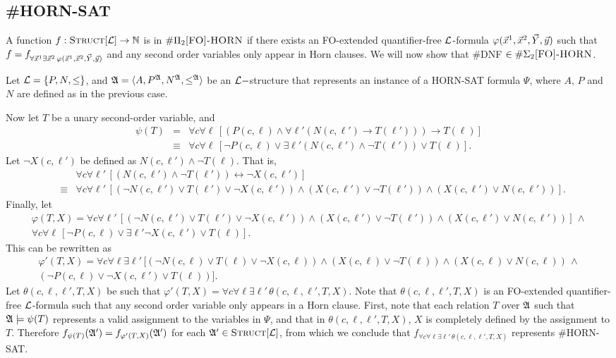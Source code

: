 \subsection{{\sc \#HORN-SAT}}
A function $f:\textsc{Struct}[{\cal L}] \to \mathbb{N}$ is in $\#\Pi_2\textsc{[FO]-HORN}$ if there exists an {\sc FO}-extended quantifier-free ${\cal L}$-formula $\varphi(\vec{x}^1,\vec{x}^2,\vec{Y},\vec{y})$ such that $f = f_{\forall\vec{x}^1\exists \vec{x}^2\,\varphi(\vec{x}^1,\vec{x}^2,\vec{Y},\vec{y})}$ and any second order variables only appear in Horn clauses. We will now show that {\sc \#DNF} $\in\#\Sigma_2\textsc{[FO]-HORN}$.

Let ${\cal L} = \{P,N,\leq\}$, and ${\frak A} = \langle A, P^{\frak A}, N^{\frak A}, \leq^{\frak A} \rangle$ be an ${\cal L}-$structure that represents an instance of a {\sc HORN-SAT} formula $\Psi$, where $A$, $P$ and $N$ are defined as in the previous case.

Now let $T$ be a unary second-order variable, and
\begin{eqnarray*}
	\psi(T) &=& \forall c \forall \ell\, [(P(c,\ell)\wedge\forall\ell'(N(c,\ell')\to T(\ell')))\to T(\ell)] \\
	&\equiv& \forall c \forall \ell\, [\neg P(c,\ell)\vee \exists\ell'(N(c,\ell')\wedge \neg T(\ell'))\vee T(\ell)].
\end{eqnarray*}
Let $\neg X(c,\ell')$ be defined as $N(c,\ell')\wedge \neg T(\ell)$. That is,
\begin{eqnarray*}
	&& \forall c \forall \ell'\, [(N(c,\ell') \wedge \neg T(\ell')) \leftrightarrow \neg X(c,\ell')]\\
	&\equiv& \forall c \forall \ell'\,[(\neg N(c,\ell')\vee T(\ell')\vee \neg X(c,\ell'))\wedge (X(c,\ell')\vee \neg T(\ell'))\wedge (X(c,\ell')\vee N(c,\ell'))].
\end{eqnarray*}
Finally, let
\begin{multline*}
	\varphi(T,X) = \forall c \forall \ell'\,[(\neg N(c,\ell')\vee T(\ell')\vee \neg X(c,\ell'))\wedge (X(c,\ell')\vee \neg T(\ell'))\wedge (X(c,\ell')\vee N(c,\ell'))]\,\wedge \\
	\forall c \forall \ell\, [\neg P(c,\ell)\vee \exists\ell'\neg X(c,\ell')\vee T(\ell)]	.
\end{multline*}
This can be rewritten as
\begin{multline*}
	\varphi'(T,X) = \forall c \forall \ell \exists\ell'\,[(\neg N(c,\ell)\vee T(\ell)\vee \neg X(c,\ell))\wedge (X(c,\ell)\vee \neg T(\ell))\wedge (X(c,\ell)\vee N(c,\ell))\,\wedge \\
	(\neg P(c,\ell)\vee \neg X(c,\ell')\vee T(\ell))].
\end{multline*}
Let $\theta(c,\ell,\ell',T,X)$ be such that $\varphi'(T,X) = \forall c \forall \ell \exists\ell'\,\theta(c,\ell,\ell',T,X)$. Note that $\theta(c,\ell,\ell',T,X)$ is an {\sc FO}-extended quantifier-free ${\cal L}$-formula such that any second order variable only appears in a Horn clause. First, note that each relation $T$ over ${\frak A}$ such that ${\frak A}\models \psi(T)$ represents a valid assignment to the variables in $\Psi$, and that in $\theta(c,\ell,\ell',T,X)$, $X$ is completely defined by the assignment to $T$. Therefore $f_{\psi(T)}({\frak A}') = f_{\varphi'(T,X)}({\frak A}')$ for each ${\frak A}'\in\textsc{Struct}[{\cal L}]$, from which we conclude that $f_{\forall c \forall \ell \exists\ell'\,\theta(c,\ell,\ell',T,X)}$ represents {\sc \#HORN-SAT}. 
